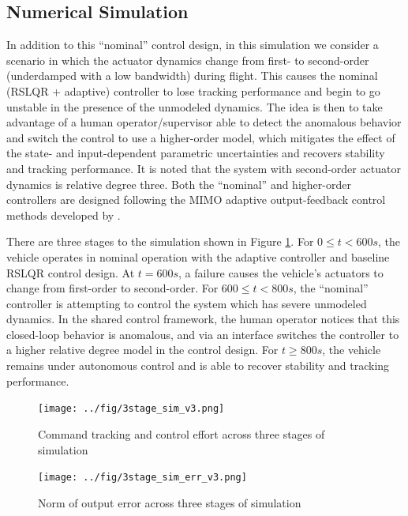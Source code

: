 \documentclass[english]{ifacconf}
\begin{document}
\subsection{Numerical Simulation}
In addition to this ``nominal'' control design, in this simulation we consider a scenario in which the actuator dynamics change from first- to second-order (underdamped with a low bandwidth) during flight. This causes the nominal (RSLQR + adaptive) controller to lose tracking performance and begin to go unstable in the presence of the unmodeled dynamics. The idea is then to take advantage of a human operator/supervisor able to detect the anomalous behavior and switch the control to use a higher-order model, which mitigates the effect of the state- and input-dependent parametric uncertainties and recovers stability and tracking performance. It is noted that the system with second-order actuator dynamics is relative degree three. Both the ``nominal'' and higher-order controllers are designed following the MIMO adaptive output-feedback control methods developed by \cite{qu2016phd}.

There are three stages to the simulation shown in Figure \ref{fig:sim}. For $0 \leq t < 600 s$, the vehicle operates in nominal operation with the adaptive controller and baseline RSLQR control design. At $t = 600 s$, a failure causes the vehicle's actuators to change from first-order to second-order. For $600 \leq t < 800 s$, the ``nominal'' controller is attempting to control the system which has severe unmodeled dynamics. In the shared control framework, the human operator notices that this closed-loop behavior is anomalous, and via an interface switches the controller to a higher relative degree model in the control design. For $t \geq 800 s$, the vehicle remains under autonomous control and is able to recover stability and tracking performance.

\begin{figure}[htbp]
	\centering
	\texttt{[image: ../fig/3stage\_sim\_v3.png]}
	\caption{Command tracking and control effort across three stages of simulation}
	\label{fig:sim}
\end{figure}

\begin{figure}[htbp]
	\centering
	\texttt{[image: ../fig/3stage\_sim\_err\_v3.png]}
	\caption{Norm of output error across three stages of simulation}
	\label{fig:err}
\end{figure}


\end{document}
